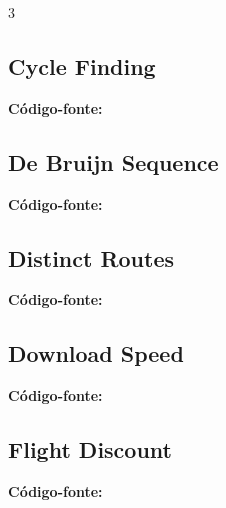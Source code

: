 \documentclass[8pt]{extarticle}
\begin{document}
\begin{multicols*}{3}
\subsection{Cycle Finding}
\begin{caixaenunciado}

\end{caixaenunciado}
\vspace{0.3cm}
\noindent\textbf{Código-fonte:}


\subsection{De Bruijn Sequence}
\begin{caixaenunciado}

\end{caixaenunciado}
\vspace{0.3cm}
\noindent\textbf{Código-fonte:}


\subsection{Distinct Routes}
\begin{caixaenunciado}

\end{caixaenunciado}
\vspace{0.3cm}
\noindent\textbf{Código-fonte:}


\subsection{Download Speed}
\begin{caixaenunciado}

\end{caixaenunciado}
\vspace{0.3cm}
\noindent\textbf{Código-fonte:}


\subsection{Flight Discount}
\begin{caixaenunciado}

\end{caixaenunciado}
\vspace{0.3cm}
\noindent\textbf{Código-fonte:}



\end{multicols*}
\end{document}
